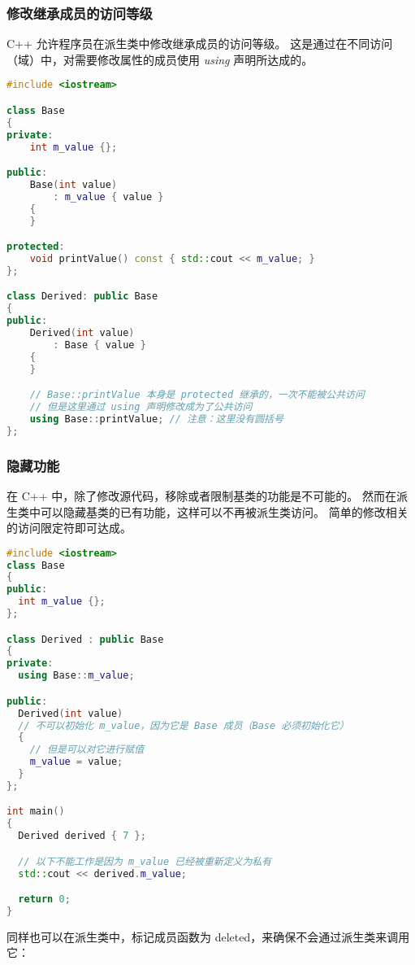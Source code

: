 \documentclass[../../LearnCpp.tex]{subfiles}
\begin{document}

\subsubsection*{修改继承成员的访问等级}

C++ 允许程序员在派生类中修改继承成员的访问等级。
这是通过在不同访问（域）中，对需要修改属性的成员使用 \textit{using} 声明所达成的。

\begin{lstlisting}[language=C++]
#include <iostream>

class Base
{
private:
    int m_value {};

public:
    Base(int value)
        : m_value { value }
    {
    }

protected:
    void printValue() const { std::cout << m_value; }
};

class Derived: public Base
{
public:
    Derived(int value)
        : Base { value }
    {
    }

    // Base::printValue 本身是 protected 继承的，一次不能被公共访问
    // 但是这里通过 using 声明修改成为了公共访问
    using Base::printValue; // 注意：这里没有圆括号
};
\end{lstlisting}

\subsubsection*{隐藏功能}

在 C++ 中，除了修改源代码，移除或者限制基类的功能是不可能的。
然而在派生类中可以隐藏基类的已有功能，这样可以不再被派生类访问。
简单的修改相关的访问限定符即可达成。

\begin{lstlisting}[language=C++]
#include <iostream>
class Base
{
public:
  int m_value {};
};

class Derived : public Base
{
private:
  using Base::m_value;

public:
  Derived(int value)
  // 不可以初始化 m_value，因为它是 Base 成员（Base 必须初始化它）
  {
    // 但是可以对它进行赋值
    m_value = value;
  }
};

int main()
{
  Derived derived { 7 };

  // 以下不能工作是因为 m_value 已经被重新定义为私有
  std::cout << derived.m_value;

  return 0;
}
\end{lstlisting}

同样也可以在派生类中，标记成员函数为 deleted，来确保不会通过派生类来调用它：
\end{document}
